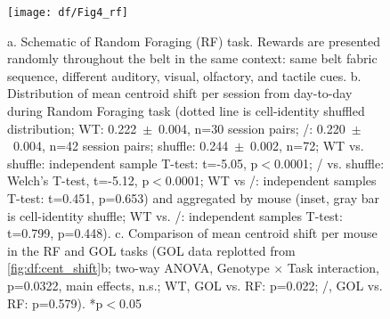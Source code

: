 \begin{figure}
	\centering
	\texttt{[image: df/Fig4\_rf]}
	\caption[Lack of task-dependent stability of spatial maps in \df/ mice]{a. Schematic of Random Foraging (RF) task. Rewards are presented randomly throughout the belt in the same context: same belt fabric sequence, different auditory, visual, olfactory, and tactile cues.
	b. Distribution of mean centroid shift per session from day-to-day during Random Foraging task (dotted line is cell-identity shuffled distribution; WT: 0.222~$\pm$~0.004, n=30 session pairs; \df/: 0.220~$\pm$~0.004, n=42 session pairs; shuffle: 0.244~$\pm$~0.002, n=72; WT vs. shuffle: independent sample T-test: t=-5.05, p$<$0.0001; \df/ vs. shuffle: Welch's T-test, t=-5.12, p$<$0.0001; WT vs \df/: independent samples T-test: t=0.451, p=0.653) and aggregated by mouse (inset, gray bar is cell-identity shuffle; WT vs. \df/: independent samples T-test: t=0.799, p=0.448).
	c. Comparison of mean centroid shift per mouse in the RF and GOL tasks (GOL data replotted from \autoref{fig:df:cent_shift}b; two-way ANOVA, Genotype $\times$ Task interaction, p=0.0322, main effects, n.s.; WT, GOL vs. RF: p=0.022; \df/, GOL vs. RF: p=0.579). *p$<$0.05}
	\label{fig:df:RF}
\end{figure}

